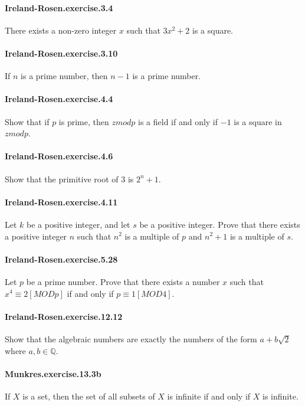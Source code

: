 \documentclass{article}
\begin{document}
\paragraph{Ireland-Rosen.exercise.3.4} There exists a non-zero integer $x$ such that $3x^2 + 2$ is a square.

\paragraph{Ireland-Rosen.exercise.3.10} If $n$ is a prime number, then $n-1$ is a prime number.

\paragraph{Ireland-Rosen.exercise.4.4} Show that if $p$ is prime, then $zmod p$ is a field if and only if $-1$ is a square in $zmod p$.

\paragraph{Ireland-Rosen.exercise.4.6} Show that the primitive root of $3$ is $2^n + 1$.

\paragraph{Ireland-Rosen.exercise.4.11} Let $k$ be a positive integer, and let $s$ be a positive integer. Prove that there exists a positive integer $n$ such that $n^2$ is a multiple of $p$ and $n^2+1$ is a multiple of $s$.

\paragraph{Ireland-Rosen.exercise.5.28} Let $p$ be a prime number. Prove that there exists a number $x$ such that $x^4 ≡ 2 [MOD p]$ if and only if $p ≡ 1 [MOD 4]$.

\paragraph{Ireland-Rosen.exercise.12.12} Show that the algebraic numbers are exactly the numbers of the form $a + b \sqrt{2}$ where $a, b \in \mathbb{Q}$.

\paragraph{Munkres.exercise.13.3b} If $X$ is a set, then the set of all subsets of $X$ is infinite if and only if $X$ is infinite.
\end{document}
